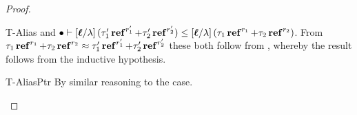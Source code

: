 \begin{proof}
\begin{enumerate}
\begin{rneqncase}{T-Alias}
      and $ \bullet   \vdash  \ottsym{[}  \oldvec{\ell}  \ottsym{/}  \lambda  \ottsym{]} \, \ottsym{(}    \tau'_{{\mathrm{1}}}  \TREF^{ r'_{{\mathrm{1}}} }   \ottsym{+}  \tau'_{{\mathrm{2}}}  \TREF^{ r'_{{\mathrm{2}}} }   \ottsym{)}  \leq  \ottsym{[}  \oldvec{\ell}  \ottsym{/}  \lambda  \ottsym{]} \, \ottsym{(}    \tau_{{\mathrm{1}}}  \TREF^{ r_{{\mathrm{1}}} }   \ottsym{+}  \tau_{{\mathrm{2}}}  \TREF^{ r_{{\mathrm{2}}} }   \ottsym{)}$. From
      $  \tau_{{\mathrm{1}}}  \operatorname{\mathbf{ref}}^{ r_{{\mathrm{1}}} }   +  \tau_{{\mathrm{2}}}  \operatorname{\mathbf{ref}}^{ r_{{\mathrm{2}}} }   \approx    \tau'_{{\mathrm{1}}}  \operatorname{\mathbf{ref}}^{ r'_{{\mathrm{1}}} }   +  \tau'_{{\mathrm{2}}}  \operatorname{\mathbf{ref}}^{ r'_{{\mathrm{2}}} } $ these both follow from ,
      whereby the result follows from the inductive hypothesis.
    \end{rneqncase}

    \begin{rncase}{T-AliasPtr}
      By similar reasoning to the  case.
    \end{rncase}


\end{enumerate}
\end{proof}
